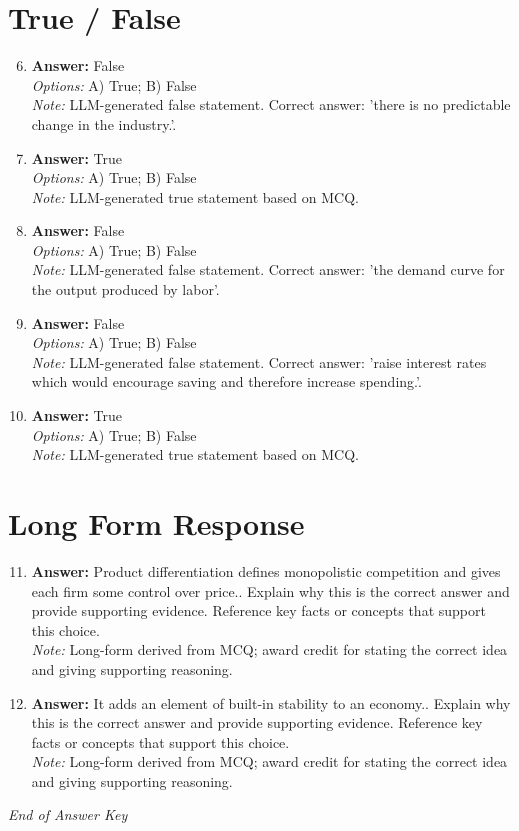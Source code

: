 \documentclass[12pt]{article}
\begin{document}
\section*{True / False}
\begin{enumerate}[label=\arabic*.]
\setcounter{enumi}{5}
\item \textbf{Answer:} False
\\ \textit{Options:} A) True; B) False
\\ \textit{Note:} LLM-generated false statement. Correct answer: 'there is no predictable change in the industry.'.
\item \textbf{Answer:} True
\\ \textit{Options:} A) True; B) False
\\ \textit{Note:} LLM-generated true statement based on MCQ.
\item \textbf{Answer:} False
\\ \textit{Options:} A) True; B) False
\\ \textit{Note:} LLM-generated false statement. Correct answer: 'the demand curve for the output produced by labor'.
\item \textbf{Answer:} False
\\ \textit{Options:} A) True; B) False
\\ \textit{Note:} LLM-generated false statement. Correct answer: 'raise interest rates which would encourage saving and therefore increase spending.'.
\item \textbf{Answer:} True
\\ \textit{Options:} A) True; B) False
\\ \textit{Note:} LLM-generated true statement based on MCQ.
\end{enumerate}

\section*{Long Form Response}
\begin{enumerate}[label=\arabic*.]
\setcounter{enumi}{10}
\item \textbf{Answer:} Product differentiation defines monopolistic competition and gives each firm some control over price.. Explain why this is the correct answer and provide supporting evidence. Reference key facts or concepts that support this choice.
\\ \textit{Note:} Long-form derived from MCQ; award credit for stating the correct idea and giving supporting reasoning.
\item \textbf{Answer:} It adds an element of built-in stability to an economy.. Explain why this is the correct answer and provide supporting evidence. Reference key facts or concepts that support this choice.
\\ \textit{Note:} Long-form derived from MCQ; award credit for stating the correct idea and giving supporting reasoning.
\end{enumerate}

\vfill
\noindent\textit{End of Answer Key}
\end{document}

